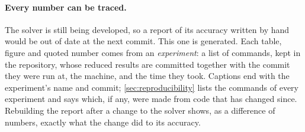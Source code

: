 \paragraph{Every number can be traced.} The solver is still being developed, so a report of
its accuracy written by hand would be out of date at the next commit. This one is generated.
Each table, figure and quoted number comes from an \emph{experiment}: a list of commands,
kept in the repository, whose reduced results are committed together with the commit they
were run at, the machine, and the time they took. Captions end with the experiment's name
and commit; \cref{sec:reproducibility} lists the commands of every experiment and says which,
if any, were made from code that has changed since. Rebuilding the report after a change to
the solver shows, as a difference of numbers, exactly what the change did to its accuracy.

